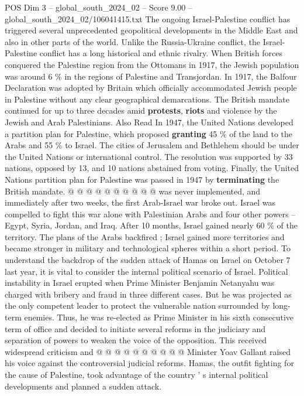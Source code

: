 \begin{textsample}{POS Dim 3 – global\_south\_2024\_02 – Score 9.00 – global\_south\_2024\_02/106041415.txt}  \label{ex:f3_pos_362}
The ongoing Israel-Palestine conflict has triggered several unprecedented geopolitical developments in the Middle East and also in other parts of the world.
Unlike the Russia-Ukraine conflict, the Israel-Palestine conflict has a long historical and ethnic rivalry.
When British forces conquered the Palestine region from the Ottomans in 1917, the Jewish population was around 6 \% in the regions of Palestine and Transjordan.
In 1917, the Balfour Declaration was adopted by Britain which officially accommodated Jewish people in Palestine without any clear geographical demarcations.
The British mandate continued for up to three decades amid \textbf{protests}, \textbf{riots} and violence by the Jewish and Arab Palestinians.
Also Read In 1947, the United Nations developed a partition plan for Palestine, which proposed \textbf{granting} 45 \% of the land to the Arabs and 55 \% to Israel.
The cities of Jerusalem and Bethlehem should be under the United Nations or international control.
The resolution was supported by 33 nations, opposed by 13, and 10 nations abstained from voting.
Finally, the United Nations partition plan for Palestine was passed in 1947 by \textbf{terminating} the British mandate. @ @ @ @ @ @ @ @ @ @ was never implemented, and immediately after two weeks, the first Arab-Israel war broke out.
Israel was compelled to fight this war alone with Palestinian Arabs and four other powers -- Egypt, Syria, Jordan, and Iraq.
After 10 months, Israel gained nearly 60 \% of the territory.
The plans of the Arabs backfired ; Israel gained more territories and became stronger in military and technological spheres within a short period.
To understand the backdrop of the sudden attack of Hamas on Israel on October 7 last year, it is vital to consider the internal political scenario of Israel.
Political instability in Israel erupted when Prime Minister Benjamin Netanyahu was charged with bribery and fraud in three different cases.
But he was projected as the only competent leader to protect the vulnerable nation surrounded by long-term enemies.
Thus, he was re-elected as Prime Minister in his sixth consecutive term of office and decided to initiate several reforms in the judiciary and separation of powers to weaken the voice of the opposition.
This received widespread criticism and @ @ @ @ @ @ @ @ @ @ Minister Yoav Gallant raised his voice against the controversial judicial reforms.
Hamas, the outfit fighting for the cause of Palestine, took advantage of the country ' s internal political developments and planned a sudden attack.

\end{textsample}
